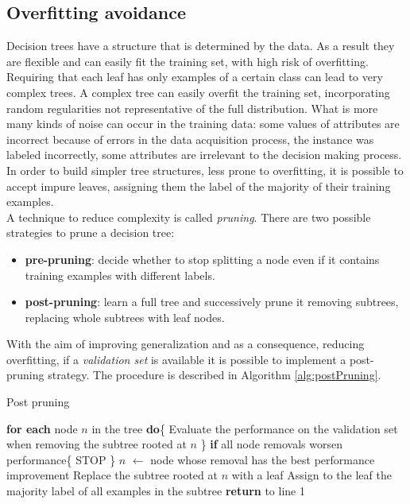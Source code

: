 \subsection{Overfitting avoidance}
Decision trees have a structure that is determined by the data. As a result they are flexible and can easily fit the training set, with high risk of
overfitting.\\
Requiring that each leaf has only examples of a certain class can lead to very complex trees. A complex tree can easily overfit the training set, incorporating random regularities not representative of the full distribution. What is more many kinds of noise can occur in the training data: some values of attributes are incorrect because of errors in the data acquisition process, the instance was labeled incorrectly, some attributes are irrelevant to the decision making process. In order to build simpler tree structures, less prone to overfitting, it is possible to accept impure leaves, assigning them the label of the majority of their training examples.\\
A technique to reduce complexity is called \textit{pruning}. There are two possible strategies to prune a decision tree:
\begin{itemize}
    \item \textbf{pre-pruning}: decide whether to stop splitting a node even if it contains training examples with different labels.
    \item \textbf{post-pruning}: learn a full tree and successively prune it removing subtrees, replacing whole subtrees with leaf nodes.
\end{itemize}

With the aim of improving generalization and as a consequence, reducing overfitting, if a \textit{validation set} is available it is possible to implement a post-pruning strategy. The procedure is described in Algorithm \ref{alg:postPruning}.

\begin{algorithm}
\caption{Post pruning \label{alg:postPruning}}
\begin{algorithmic}[1]
\STATE \textbf{for each} node $n$ in the tree \textbf{do}\{
\STATE \tab Evaluate the performance on the validation set
\STATE \tab when removing the subtree rooted at $n$
\STATE \}
\STATE \textbf{if} all node removals worsen performance\{
\STATE \tab STOP
\STATE \}
\STATE
\STATE $n$ $\leftarrow$ node whose removal has the best performance improvement
\STATE
\STATE Replace the subtree rooted at $n$ with a leaf
\STATE
\STATE Assign to the leaf the majority label of all examples in the subtree
\STATE
\STATE \textbf{return} to line 1
\end{algorithmic}
\end{algorithm}

